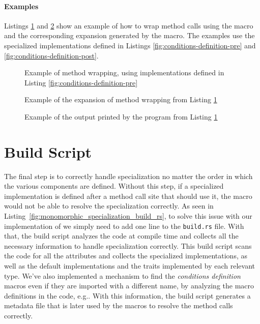 \paragraph{Examples}
Listings \ref{fig:method-wrapping-pre} and \ref{fig:method-wrapping-post} show an example of how to wrap method calls using the  macro and the corresponding expansion generated by the macro.
The examples use the specialized implementations defined in Listings \ref{fig:conditions-definition-pre} and \ref{fig:conditions-definition-post}.

\begin{figure}[htbp!]
	\centering
	\captionsetup{type=listing,skip=2pt}
	\caption{Example of method wrapping, using implementations defined in Listing \ref{fig:conditions-definition-pre}}
	\label{fig:method-wrapping-pre}
\end{figure}

\begin{figure}[htbp!]
	\centering
	\captionsetup{type=listing,skip=2pt}
	\caption{Example of the expansion of method wrapping from Listing \ref{fig:method-wrapping-pre}}
	\label{fig:method-wrapping-post}
\end{figure}

\begin{figure}[htbp!]
	\centering
	\captionsetup{type=listing,skip=2pt}
	\caption{Example of the output printed by the program from Listing \ref{fig:method-wrapping-pre}}
	\label{fig:method-wrapping-output}
\end{figure}


\section{Build Script}\label{sec:build_script}
The final step is to correctly handle specialization no matter the order in which the various components are defined.
Without this step, if a specialized implementation is defined after a method call site that should use it, the macro would not be able to resolve the specialization correctly.
As seen in Listing~\ref{fig:monomorphic_specialization_build_rs}, to solve this issue with our implementation of \mytool{} we simply need to add one line to the \texttt{build.rs} file.
With that, the build script analyzes the code at compile time and collects all the necessary information to handle specialization correctly.
This build script scans the code for all the  attributes and collects the specialized implementations, as well as the default implementations and the traits implemented by each relevant type.
We've also implemented a mechanism to find the \textit{conditions definition} macros even if they are imported with a different name, by analyzing the macro definitions in the code, e.g.\@ {}.
With this information, the build script generates a metadata file that is later used by the macros to resolve the method calls correctly.

